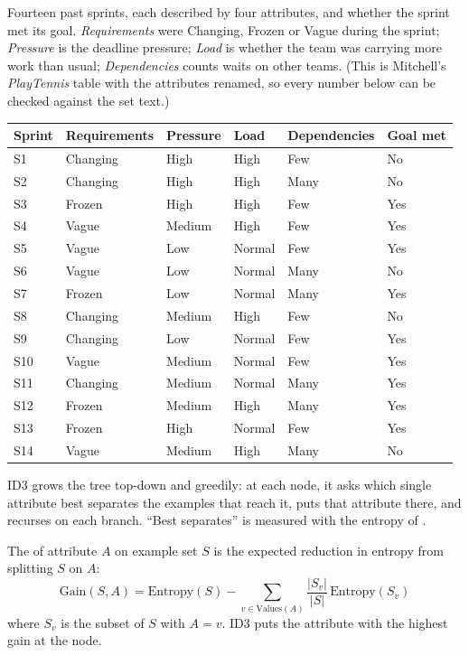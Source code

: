 Fourteen past sprints, each described by four attributes, and whether the sprint
met its goal. \emph{Requirements} were Changing, Frozen or Vague during the
sprint; \emph{Pressure} is the deadline pressure; \emph{Load} is whether the team
was carrying more work than usual; \emph{Dependencies} counts waits on other
teams. (This is Mitchell's \emph{PlayTennis} table with the attributes renamed,
so every number below can be checked against the set text.)

\begin{longtable}{@{}L{1.3cm}L{2.5cm}L{2.2cm}L{2.0cm}L{2.6cm}L{2.2cm}@{}}
\toprule
{}
\textbf{Sprint} & \textbf{Requirements} & \textbf{Pressure} & \textbf{Load} & \textbf{Dependencies} & \textbf{Goal met} \\
\midrule
\endhead
S1 & Changing & High & High & Few & No \\
S2 & Changing & High & High & Many & No \\
S3 & Frozen & High & High & Few & Yes \\
S4 & Vague & Medium & High & Few & Yes \\
S5 & Vague & Low & Normal & Few & Yes \\
S6 & Vague & Low & Normal & Many & No \\
S7 & Frozen & Low & Normal & Many & Yes \\
S8 & Changing & Medium & High & Few & No \\
S9 & Changing & Low & Normal & Few & Yes \\
S10 & Vague & Medium & Normal & Few & Yes \\
S11 & Changing & Medium & Normal & Many & Yes \\
S12 & Frozen & Medium & High & Many & Yes \\
S13 & Frozen & High & Normal & Few & Yes \\
S14 & Vague & Medium & High & Many & No \\
\bottomrule
\end{longtable}

ID3 grows the tree top-down and greedily: at each node, it asks which single
attribute best separates the examples that reach it, puts that attribute there,
and recurses on each branch. ``Best separates'' is measured with the entropy of
.

\begin{definitionbox}
The  of attribute $A$ on example set $S$ is the expected
reduction in entropy from splitting $S$ on $A$:
\[
\text{Gain}(S, A) = \text{Entropy}(S) - \sum_{v \in \text{Values}(A)}
\frac{|S_v|}{|S|}\,\text{Entropy}(S_v)
\]
where $S_v$ is the subset of $S$ with $A = v$. ID3 puts the attribute with the
highest gain at the node.
\end{definitionbox}

